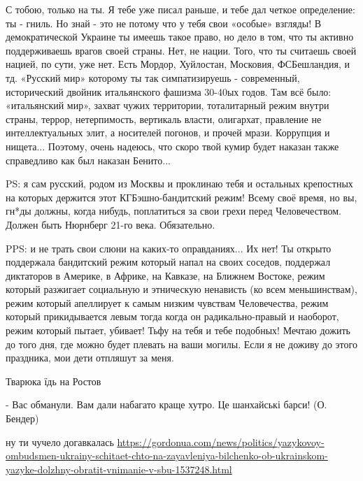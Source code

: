 \begin{itemize}


С тобою, только на ты. Я тебе уже писал раньше, и тебе дал четкое определение:
ты - гниль. Но знай - это не потому что у тебя свои «особые» взгляды! В
демократической Украине ты имеешь такое право, но дело в том, что ты активно
поддерживаешь врагов своей страны. Нет, не нации. Того, что ты считаешь своей
нацией, по сути, уже нет. Есть Мордор, Хуйлостан, Московия, ФСБешландия, и тд.
«Русский мир» которому ты так симпатизируешь - современный, исторический
двойник итальянского фашизма 30-40ых годов. Там всё было: «итальянский мир»,
захват чужих территории, тоталитарный режим внутри страны, террор,
нетерпимость, вертикаль власти, олигархат, правление не интеллектуальных элит,
а носителей погонов, и прочей мрази. Коррупция и нищета... Поэтому, очень
надеюсь, что скоро твой кумир будет наказан также справедливо как был наказан
Бенито...

PS: я сам русский, родом из Москвы и проклинаю тебя и остальных крепостных на
которых держится этот КГБэшно-бандитский режим! Всему своё время, но вы, гн*ды
должны, когда нибудь, поплатиться за свои грехи перед Человечеством. Должен
быть Нюрнберг 21-го века. Обязательно.

PPS: и не трать свои слюни на каких-то оправданиях... Их нет! Ты открыто
поддержала бандитский режим который напал на своих соседов, поддержал
диктаторов в Америке, в Африке, на Кавказе, на Ближнем Востоке, режим который
разжигает социальную и этническую ненависть (ко всем меньшинствам), режим
который апеллирует к самым низким чувствам Человечества, режим который
прикидывается левым тогда когда он радикально-правый и наоборот, режим который
пытает, убивает! Тьфу на тебя и тебе подобных! Мечтаю дожить до того дня, где
можно будет плевать на ваши могилы. Если я не доживу до этого праздника, мои
дети отпляшут за меня.


Тварюка їдь на Ростов


- Вас обманули. Вам дали набагато краще хутро. Це шанхайські барси! (О. Бендер)

ну ти чучело догавкалась
\url{https://gordonua.com/news/politics/yazykovoy-ombudsmen-ukrainy-schitaet-chto-na-zayavleniya-bilchenko-ob-ukrainskom-yazyke-dolzhny-obratit-vnimanie-v-sbu-1537248.html}


\end{itemize}
